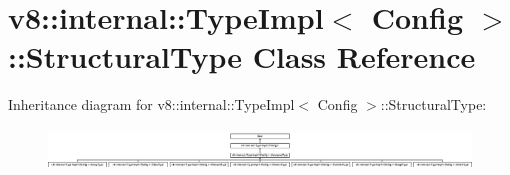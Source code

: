 \hypertarget{classv8_1_1internal_1_1_type_impl_1_1_structural_type}{}\section{v8\+:\+:internal\+:\+:Type\+Impl$<$ Config $>$\+:\+:Structural\+Type Class Reference}
\label{classv8_1_1internal_1_1_type_impl_1_1_structural_type}
Inheritance diagram for v8\+:\+:internal\+:\+:Type\+Impl$<$ Config $>$\+:\+:Structural\+Type\+:\begin{figure}[H]
\begin{center}
\leavevmode
\includegraphics[height=1.111111cm]{classv8_1_1internal_1_1_type_impl_1_1_structural_type}
\end{center}
\end{figure}
